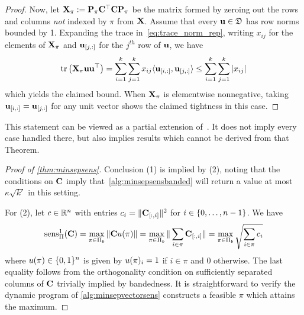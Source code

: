 \documentclass{article}
\begin{document}
\begin{proof}


Now, let $\mathbf{X}_\pi := \mathbf{P}_\pi \mathbf{C}^\top\mathbf{C} \mathbf{P}_\pi$ be the matrix formed by zeroing out the rows and columns \emph{not} indexed by $\pi$ from $\mathbf{X}$. Assume that every $\mathbf{u} \in \mathfrak{D}$ has row norms bounded by 1. Expanding the trace in~\cref{eq:trace_norm_rep}, writing $x_{ij}$ for the elements of $\mathbf{X}_\pi$ and $\mathbf{u}_{[j, :]}$ for the $j^{th}$ row of $\mathbf{u}$, we have 
$$
\mathrm{tr}\left(\mathbf{X}_\pi \mathbf{u}\mathbf{u}^\top\right) = \sum_{i=1}^k\sum_{j=1}^k x_{ij}\langle \mathbf{u}_{[i, :]}, \mathbf{u}_{[j, :]}\rangle \leq \sum_{i=1}^k\sum_{j=1}^k |x_{ij}|
$$
which yields the claimed bound. When $\mathbf{X}_\pi$ is elementwise nonnegative, taking $\mathbf{u}_{[i, :]} = \mathbf{u}_{[j, :]}$ for any unit vector shows the claimed tightness in this case.


\end{proof}
 This statement can be viewed as a partial extension of~\citep[Theorem G.1]{choquette2022multi}. It does not imply every case handled there, but also implies results which cannot be derived from that Theorem.


\begin{proof}[Proof of \cref{thm:minsepsens}]
Conclusion (1) is implied by (2), noting that the conditions on $\mathbf{C}$ imply that~\cref{alg:minsepsensbanded} will return a value at most $\kappa\sqrt{k'}$ in this setting.


For (2), let $c \in \mathbb{R}^{n}$ with entries $c_i = \| \mathbf{C}_{[:, i]} \|^2$ for $i \in \{0, \dots, n-1\}$. We have
\begin{equation}\label{eq:orthcolnorm}
\operatorname{sens}^1_{\Pi}(\mathbf{C}) 
  = \max_{\pi \in \Pi_b} \| \mathbf{C} u(\pi) \| 
  = \max_{\pi \in \Pi_b} \| \sum_{i \in \pi} \mathbf{C}_{[:, i]} \|  
  = \max_{\pi \in \Pi_b} \sqrt{\sum_{i \in \pi} c_i}
\end{equation}
where $u(\pi) \in \{0, 1\}^{n}$ is given by $u(\pi)_i = 1$ if $i \in \pi$ and $0$ otherwise. The last equality follows from the orthogonality condition on sufficiently separated columns of $\mathbf{C}$ trivially implied by bandedness. It is straightforward to verify the dynamic program of \cref{alg:minsepvectorsens} constructs a feasible $\pi$ which attains the maximum.
\end{proof}
\end{document}
